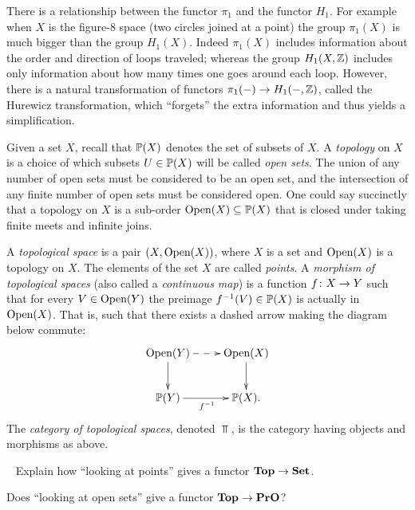 \documentclass[CT4S-EN-RU]{subfiles}
\begin{document}
\begin{blockENG}
There is a relationship between the functor $\pi_1$ and the functor $H_1$. For example when $X$ is the figure-$8$ space (two circles joined at a point) the group $\pi_1(X)$ is much bigger than the group $H_1(X)$. Indeed $\pi_1(X)$ includes information about the order and direction of loops traveled; whereas the group $H_1(X,{\mathbb Z})$ includes only information about how many times one goes around each loop. However, there is a natural transformation of functors $\pi_1(-)\rightarrow H_1(-,{\mathbb Z})$, called the Hurewicz transformation, which “forgets” the extra information and thus yields a simplification. 
\end{blockENG}

\begin{blockRUS}
\end{blockRUS}

\begin{exampleENG}\label{ex:topological space}
Given a set $X$, recall that ${\mathbb P}(X)$ denotes the set of subsets of $X$. A {\em topology} on $X$ is a choice of which subsets $U\in{\mathbb P}(X)$ will be called {\em open sets}. The union of any number of open sets must be considered to be an open set, and the intersection of any finite number of open sets must be considered open. One could say succinctly that a topology on $X$ is a sub-order $\textnormal{Open}(X)\subseteq{\mathbb P}(X)$ that is closed under taking finite meets and infinite joins.

A {\em topological space} is a pair $(X,\textnormal{Open}(X))$, where $X$ is a set and $\textnormal{Open}(X)$ is a topology on $X$. The elements of the set $X$ are called {\em points}. A {\em morphism of topological spaces} (also called a {\em continuous map}) is a function $f\colon X\rightarrow Y$ such that for every $V\in\textnormal{Open}(Y)$ the preimage $f^\m1(V)\in\PP(X)$ is actually in $\textnormal{Open}(X)$. That is, such that there exists a dashed arrow making the diagram below commute:
$$\xymatrix{\Op(Y)\ar@{-->}[r]\ar[d]&\Op(X)\ar[d]\\\PP(Y)\ar[r]_{f^\m1}&\PP(X).}$$
The {\em category of topological spaces}, denoted $\Top$, is the category having objects and morphisms as above.
\end{exampleENG}

\begin{exampleRUS}\label{ex:topological space}
\end{exampleRUS}

\begin{exerciseENG}\label{exc:points and opens in Top}~
\sexc Explain how “looking at points” gives a functor ${\mathbf{Top}}\rightarrow{\mathbf{Set}}$.
\item Does “looking at open sets” give a functor ${\mathbf{Top}}\rightarrow{\mathbf{PrO}}$?
\endsexc
\end{exerciseENG}
\end{document}
